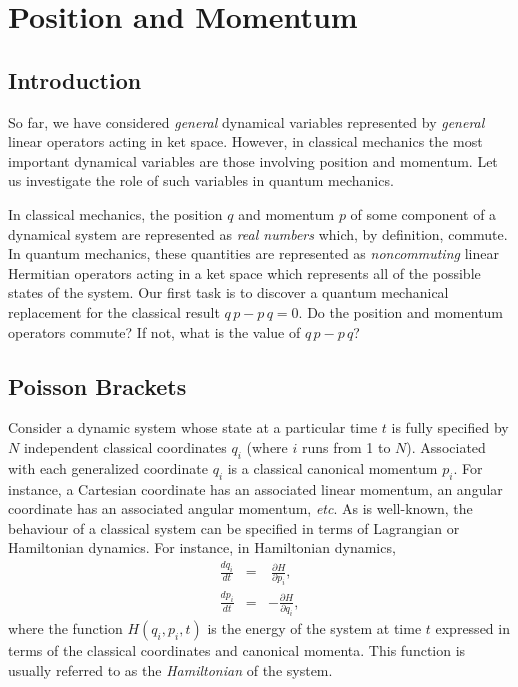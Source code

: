 \chapter{Position and Momentum}
\section{Introduction}
So far, we have considered {\em general} dynamical variables represented by 
{\em general} linear
operators acting in ket space. However, in classical mechanics the most important
dynamical variables are those involving
position and momentum. Let us investigate 
the role of such  variables  in quantum mechanics. 

In classical mechanics, the position $q$ and momentum $p$ 
of some component of a dynamical  system are represented as {\em real numbers} which,
by definition, commute.
In quantum mechanics, these quantities are represented
as   {\em noncommuting} linear Hermitian operators acting in a ket space
which represents all of the possible states of the system. Our first task is
to discover a quantum mechanical replacement for the classical result
$q\,p-p\,q = 0$. Do the position and momentum operators commute? If not,
what is the value of $q\,p-p\,q$? 

\section{Poisson Brackets}
Consider a dynamic system whose state at a particular time $t$ is
fully specified 
by $N$ independent classical  coordinates $q_i$ (where $i$ runs from 1 to $N$). 
Associated with each generalized coordinate $q_i$ is a 
classical canonical momentum
$p_i$. For instance, a Cartesian coordinate  has an associated linear
momentum, an angular coordinate has an associated angular momentum, {\em etc}.
As is well-known, the behaviour of a classical system can be specified in terms
of Lagrangian or Hamiltonian dynamics. For instance, in Hamiltonian dynamics,
\begin{eqnarray}
\frac{d q_i}{d t} &=& ~\frac{\partial H}{\partial p_i},\\[0.5ex]
\frac{d p_i}{dt} &=& - \frac{\partial H}{\partial q_i},
\end{eqnarray}
where the function $H(q_i, p_i, t)$ is the energy of the system at time $t$
expressed in terms of the 
classical coordinates and canonical momenta. This function is
usually referred to as the {\em Hamiltonian} of the system.

